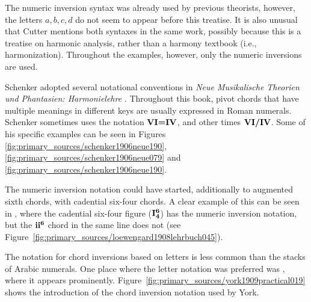 
The numeric inversion syntax was already used by previous theorists, however, the letters ${a, b, c , d}$ do not seem to appear before this treatise.
It is also unusual that Cutter mentions both syntaxes in the same work, possibly because this is a treatise on harmonic analysis, rather than a harmony textbook (i.e., harmonization).
Throughout the examples, however, only the numeric inversions are used.

Schenker adopted several notational conventions in \emph{Neue Musikalische Theorien und Phantasien: Harmonielehre} \parencite{schenker1906neue}.
Throughout this book, pivot chords that have multiple meanings in different keys are usually expressed in Roman numerals.
Schenker sometimes uses the notation $\textbf{VI=IV}\relax\relax$, and other times $\textbf{VI/IV}\relax\relax$.
Some of his specific examples can be seen in Figures \ref{fig:primary_sources/schenker1906neue190}, \ref{fig:primary_sources/schenker1906neue079} and \ref{fig:primary_sources/schenker1906neue190}.




The numeric inversion notation could have started, additionally to augmented sixth chords, with cadential six-four chords.
A clear example of this can be seen in \textcite{loewengard1908lehrbuch}, where the cadential six-four figure ($\textbf{I}\relax\relax{\footnotesize {}^\textbf{6}\relax_\textbf{4}\relax\relax}$) has the numeric inversion notation, but the $\textbf{ii}\relax\relax{\footnotesize {}^\textbf{6}\relax\relax}$ chord in the same line does not (see Figure~\ref{fig:primary_sources/loewengard1908lehrbuch045}).


The notation for chord inversions based on letters is less common than the stacks of Arabic numerals.
One place where the letter notation was preferred was \textcite{york1909practical}, where it appears prominently.
Figure~\ref{fig:primary_sources/york1909practical019} shows the introduction of the chord inversion notation used by York.

